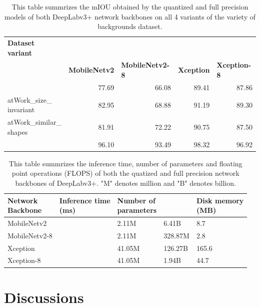 	\begin{table}
		\begin{tabular}{|l|r|r|r|r|}
		\hline
		\makecell{\textbf{Dataset} \\ \textbf{variant}} & \multicolumn{ 4}{l|}{\makecell{\textbf{mIOU in \%}}} \\ \cline{ 2- 5}
		\multicolumn{ 1}{|l|}{} & \multicolumn{1}{l|}{\textbf{MobileNetv2}} & \multicolumn{1}{l|}{\textbf{MobileNetv2-8}} & \multicolumn{1}{l|}{\textbf{Xception}} & \multicolumn{1}{l|}{\textbf{Xception-8}} \\ \hline
		\makecell{atWork\_full} & 77.69 & 66.08 & 89.41 & 87.86 \\ \hline
		\makecell{atWork\_size\_\\invariant} & 82.95 & 68.88 & 91.19 & 89.30 \\ \hline
		\makecell{atWork\_similar\_\\shapes} & 81.91 & 72.22 & 90.75 & 87.50 \\ \hline
		\makecell{atWork\_binary} & 96.10 & 93.49 & 98.32 & 96.92 \\ \hline
		\end{tabular}
		\caption{This table summrizes the mIOU obtained by the quantized and full precision models of both DeepLabv3+ network backbones on all 4 variants of the variety of backgrounds dataset.}
		\label{Table:quantmIOU}
	\end{table}
	
	\begin{table}
		\centering
		\begin{tabular}{|l|l|l|l|l|}
		\hline
		\makecell{\textbf{Network} \\ \textbf{Backbone}} & \makecell{\textbf{Inference time} \\ \textbf{(ms)}} & \makecell{\textbf{Number of} \\ \textbf{parameters}} & \makecell{\textbf{FLOPS}} & \makecell{\textbf{Disk memory} \\ \textbf{(MB)}} \\ \hline
		MobileNetv2 &  & 2.11M & 6.41B & 8.7 \\ \hline
		MobileNetv2-8 &  & 2.11M & 328.87M & 2.8 \\ \hline
		Xception &  & 41.05M & 126.27B & 165.6 \\ \hline
		Xception-8 &  & 41.05M & 1.94B & 44.7 \\ \hline
		\end{tabular}
		\caption{This table summrizes the inference time, number of parameters and floating point operations (FLOPS) of both the quatized and full precision network backbones of DeepLabv3+. "M" denotes million and "B" denotes billion.}
		\label{Table:quantMetrics}
	\end{table}
	
\section{Discussions}

